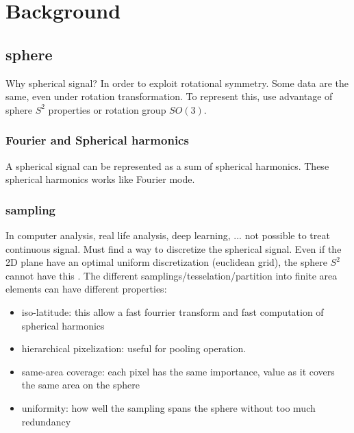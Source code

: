 \documentclass[11pt]{report}
\begin{document}
\chapter{Background}
\section{sphere}


Why spherical signal? In order to exploit rotational symmetry. Some data are the same, even under rotation transformation. To represent this, use advantage of sphere $S^2$ properties or rotation group $SO(3)$.

\subsection{Fourier and Spherical harmonics}
A spherical signal can be represented as a sum of spherical harmonics. These spherical harmonics  works like Fourier mode.


\subsection{sampling}\label{sec:sampling}
In computer analysis, real life analysis, deep learning, ... not possible to treat continuous signal. Must find a way to discretize the spherical signal. Even if the 2D plane have an optimal uniform discretization (euclidean grid), the sphere $S^2$ cannot have this \cite{cohen_spherical_2018}\cite{perraudin_deepsphere:_2018}. %
The different samplings/tesselation/partition into finite area elements can have different properties:
\begin{itemize}
    \item iso-latitude: this allow a fast fourrier transform and fast computation of spherical harmonics
    \item hierarchical pixelization: useful for pooling operation.
    \item same-area coverage: each pixel has the same importance, value as it covers the same area on the sphere
    \item uniformity: how well the sampling spans the sphere without too much redundancy
\end{itemize}
\end{document}

